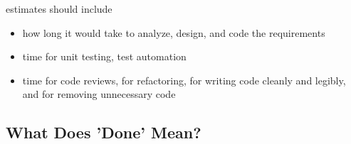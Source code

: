 estimates should include
\begin{itemize}
  \item how long it would take to analyze, design, and code the requirements
  \item time for unit testing, test automation
  \item time for code reviews, for refactoring, for writing code cleanly and legibly, and for removing unnecessary code
\end{itemize}


\subsection{What Does 'Done' Mean?}


